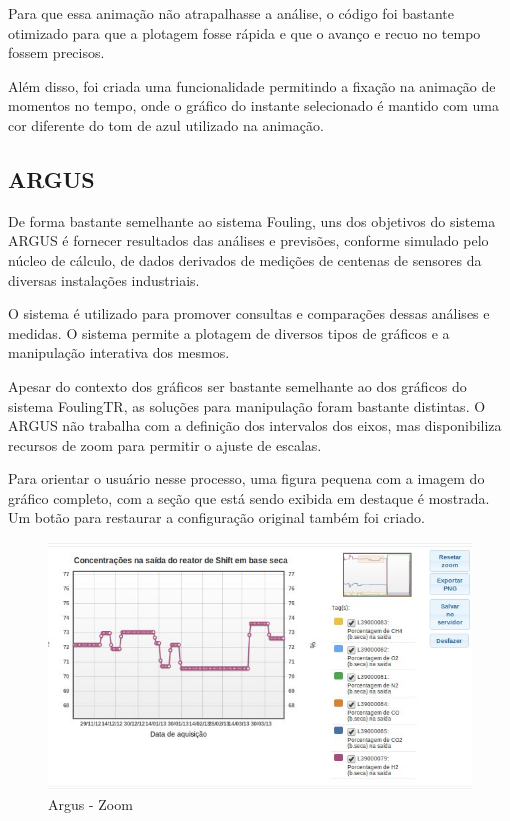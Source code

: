 \documentclass[]{article}
\begin{document}
Para que essa animação não atrapalhasse a análise, o código foi bastante otimizado para que a plotagem fosse rápida e que o avanço e recuo no tempo fossem precisos. 

Além disso, foi criada uma funcionalidade permitindo a fixação na animação de momentos no tempo, onde o gráfico do instante selecionado é mantido com uma cor diferente do tom de azul utilizado na animação.

\subsection{ARGUS}

De forma bastante semelhante ao sistema Fouling, uns dos objetivos do sistema ARGUS é fornecer resultados das análises e previsões, conforme simulado pelo núcleo de cálculo, de dados derivados de medições de centenas de sensores da diversas instalações industriais. 

O sistema é utilizado para promover consultas e comparações dessas análises e medidas. O sistema permite a plotagem de diversos tipos de gráficos e a manipulação interativa dos mesmos.

Apesar do contexto dos gráficos ser bastante semelhante ao dos gráficos do sistema FoulingTR, as soluções para manipulação foram bastante distintas. O ARGUS não trabalha com a definição dos intervalos dos eixos, mas disponibiliza recursos de zoom para permitir o ajuste de escalas. 

Para orientar o usuário nesse processo, uma figura pequena com a imagem do gráfico completo, com a seção que está sendo exibida em destaque é mostrada. Um botão para restaurar a configuração original também foi criado.

\begin{figure}[!ht]
\centering
\includegraphics[scale=.7]{./argus_zoom}
\caption{Argus - Zoom}
\label{fig:argus_zoom}
\end{figure}
\end{document}
